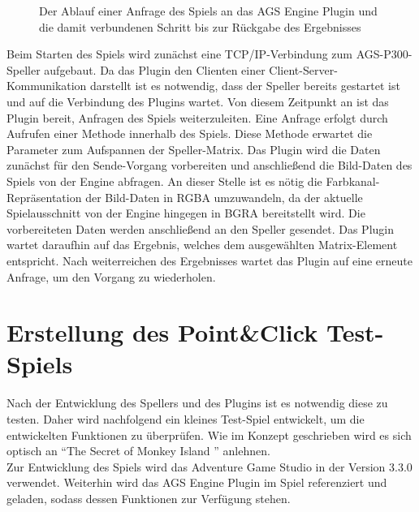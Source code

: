 \begin{figure}[h!]
\begin{center}
\begin{tikzpicture}
\end{tikzpicture}
\caption{Der Ablauf einer Anfrage des Spiels an das AGS Engine Plugin und die damit verbundenen Schritt bis zur Rückgabe des Ergebnisses}
\label{pluginPlan}
\end{center}
\end{figure}

\pagebreak

Beim Starten des Spiels wird zunächst eine TCP/IP-Verbindung zum AGS-P300-Speller aufgebaut.
Da das Plugin den Clienten einer Client-Server-Kommunikation darstellt ist es notwendig, dass der Speller bereits gestartet ist und auf die Verbindung des Plugins wartet.
Von diesem Zeitpunkt an ist das Plugin bereit, Anfragen des Spiels weiterzuleiten.
Eine Anfrage erfolgt durch Aufrufen einer Methode innerhalb des Spiels.
Diese Methode erwartet die Parameter zum Aufspannen der Speller-Matrix.
Das Plugin wird die Daten zunächst für den Sende-Vorgang vorbereiten und anschließend die Bild-Daten des Spiels von der Engine abfragen.
An dieser Stelle ist es nötig die Farbkanal-Repräsentation der Bild-Daten in \acs{RGBA} umzuwandeln, da der aktuelle Spielausschnitt von der Engine hingegen in \acs{BGRA} bereitstellt wird.
Die vorbereiteten Daten werden anschließend an den Speller gesendet.
Das Plugin wartet daraufhin auf das Ergebnis, welches dem ausgewählten Matrix-Element entspricht.
Nach weiterreichen des Ergebnisses wartet das Plugin auf eine erneute Anfrage, um den Vorgang zu wiederholen.\\








\pagebreak
\section{Erstellung des Point\&Click Test-Spiels}

Nach der Entwicklung des Spellers und des Plugins ist es notwendig diese zu testen.
Daher wird nachfolgend ein kleines Test-Spiel entwickelt, um die entwickelten Funktionen zu überprüfen.
Wie im Konzept geschrieben wird es sich optisch an "`The Secret of Monkey Island "' anlehnen.\\

Zur Entwicklung des Spiels wird das Adventure Game Studio in der Version 3.3.0 verwendet.
Weiterhin wird das AGS Engine Plugin im Spiel referenziert und geladen, sodass dessen Funktionen zur Verfügung stehen.\\

